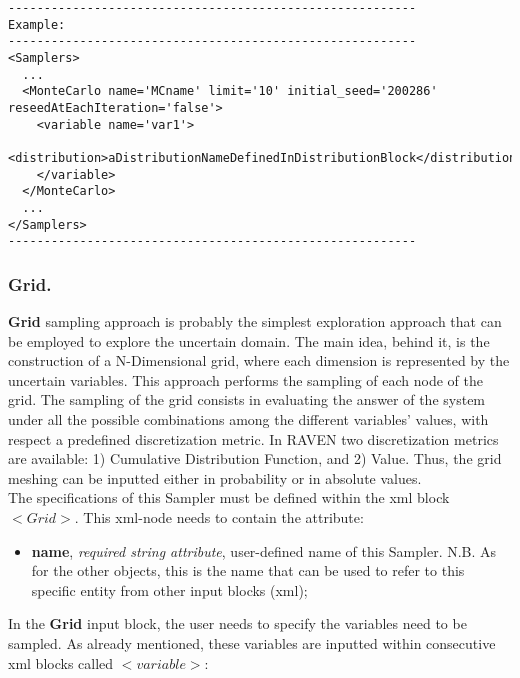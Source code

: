 \begin{lstlisting}[style=XML]
---------------------------------------------------------
Example:
---------------------------------------------------------
<Samplers>
  ...
  <MonteCarlo name='MCname' limit='10' initial_seed='200286' reseedAtEachIteration='false'> 
    <variable name='var1'> 
      <distribution>aDistributionNameDefinedInDistributionBlock</distribution> 	
    </variable> 
  </MonteCarlo>
  ...
</Samplers>
---------------------------------------------------------
\end{lstlisting}
\subsubsection{Grid.}
\label{subsubsubsec:Grid}
\textbf{Grid} sampling approach is probably the simplest exploration approach that can be employed to explore the uncertain domain. The main idea, behind it, is the construction of a N-Dimensional grid, where each dimension is represented by the uncertain variables. This approach performs the sampling of each node of the grid.  The sampling of the grid consists in evaluating the answer of the system under all the possible combinations among the different variables' values, with respect a predefined discretization metric.  In RAVEN two discretization metrics are available: 1) Cumulative Distribution Function, and 2) Value. Thus, the grid meshing can be inputted either in probability or in absolute values.
\\ The specifications of this Sampler must be defined within the xml block $<Grid>$. This xml-node needs to contain the attribute:
\begin{itemize}
\itemsep0em
\item \textbf{name}, \textit{required string attribute}, user-defined name of this Sampler. N.B. As for the other objects, this is the name that can be used to refer to this specific entity from other input blocks (xml);
\end{itemize}
In the \textbf{Grid} input block, the user needs to specify the variables need to be sampled. As already mentioned, these variables are inputted within consecutive xml blocks called $<variable>$:
